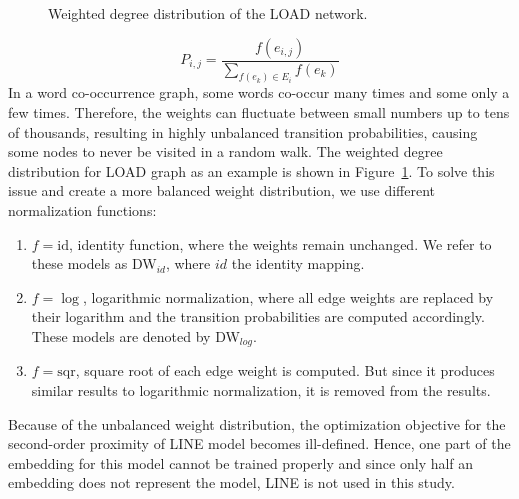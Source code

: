\begin{figure}
\centering 
\resizebox{0.6\textwidth}{0.6\textwidth}{      

}
\caption{Weighted degree distribution of the LOAD network.}
\label{fig:degrees}
\end{figure}
\begin{equation}
P_{i,j}=\frac{f(e_{i,j})}{\sum _{ f(e_ k )\in E_{ i } }^{  }{ f(e_k) } }
\label{eq:edge_weight}
\end{equation}
In a word co-occurrence graph, some words co-occur many times and some only a few times. Therefore, the weights can fluctuate between small numbers up to tens of thousands, resulting in highly unbalanced transition probabilities, causing some nodes to never be visited in a random walk. The weighted degree distribution for LOAD graph as an example is shown in Figure~\ref{fig:degrees}. To solve this issue and create a more balanced weight distribution, we use different normalization functions:
\noindent
\begin{enumerate}
\item  $f=\mathrm{id}$, identity function, where the weights remain unchanged. We refer to these models as DW$_{id}$, where $id$  the identity mapping.
\item  $f=\log$, logarithmic normalization, where all edge weights are replaced by their logarithm and the transition probabilities are computed accordingly. These models are denoted by DW$_{log}$.
\item  $f=\mathrm{sqr}$, square root of each edge weight is computed. But since it produces similar results to logarithmic normalization, it is removed from the results.
\end{enumerate}
\noindent
Because of the unbalanced weight distribution, the optimization objective for the second-order proximity of  LINE model becomes ill-defined.
Hence, one part of the embedding for this model cannot be trained properly and since only half an embedding does not represent the model, LINE is not used in this study.\\
